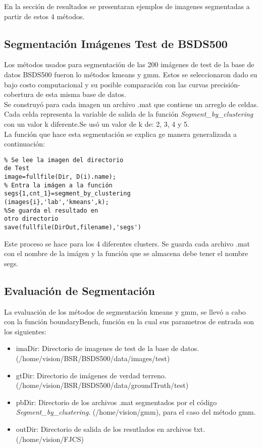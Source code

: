 \documentclass[10pt,twocolumn,letterpaper]{article}
\begin{document}
En la sección de resultados se presentaran ejemplos de imagenes segmentadas a partir de estos 4 métodos. 



\subsection{Segmentación Imágenes Test de BSDS500}


Los métodos usados para segmentación de las 200 imágenes de test de la base de datos BSDS500 fueron lo métodos kmeans y gmm. Estos se seleccionaron dado su bajo costo computacional y su posible comparación con las curvas precisión-cobertura de esta misma base de datos.\\
Se construyó para cada imagen un archivo .mat que contiene un arreglo de celdas. Cada celda representa la variable de salida de la función \textit{Segment\_by\_clustering} con un valor k diferente.Se usó un valor de k de: 2, 3, 4 y 5.\\

La función que hace esta segmentación se explica ge manera generalizada a continuación:

\begin{verbatim}
% Se lee la imagen del directorio 
de Test
image=fullfile(Dir, D(i).name);
% Entra la imágen a la función
segs{1,cnt_1}=segment_by_clustering
(images{i},'lab','kmeans',k);
%Se guarda el resultado en 
otro directorio
save(fullfile(DirOut,filename),'segs')

\end{verbatim}

Este proceso se hace para los 4 diferentes clusters. Se guarda cada archivo .mat con el nombre de la imágen y la función que se almacena debe tener el nombre segs. 

\subsection{Evaluación de Segmentación}

La evaluación de los métodos de segmentación kmeans y gmm, se llevó a cabo con la función boundaryBench, función en la cual sus parametros de entrada son los siguientes:

\begin{itemize}
\item imaDir: Directorio de imagenes de test de la base de datos. (/home/vision/BSR/BSDS500/data/images/test)
\item gtDir: Directorio de imágenes de verdad terreno. (/home/vision/BSR/BSDS500/data/groundTruth/test)
\item pbDir: Directorio de los archivos .mat segmentados por el código \textit{Segment\_by\_clustering}. (/home/vision/gmm), para el caso del método gmm.
\item outDir: Directorio de salida de los resutlados en archivos \.txt. (/home/vision/FJCS)
\end{itemize}
\end{document}
